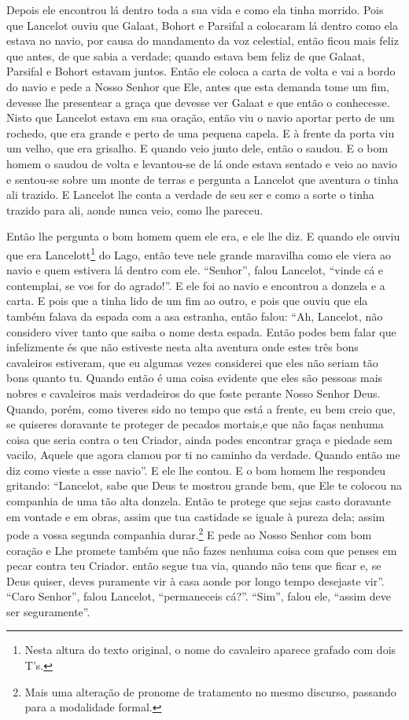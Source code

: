 Depois ele encontrou lá dentro toda a sua vida e como ela tinha morrido. Pois
que Lancelot ouviu que Galaat, Bohort e Parsifal a colocaram lá dentro como
ela estava no navio, por causa do mandamento da voz celestial, então ficou mais
feliz que antes, de que sabia a verdade; quando estava bem feliz de que Galaat,
Parsifal e Bohort estavam juntos. Então ele coloca a carta de volta e vai a
bordo do navio e pede a Nosso Senhor que Ele, antes que esta demanda tome um
fim, devesse lhe presentear a graça que devesse ver Galaat e que então o
conhecesse. Nisto que Lancelot estava em sua oração, então viu o navio aportar
perto de um rochedo, que era grande e perto de uma pequena capela. E à frente
da porta viu um velho, que era grisalho. E quando veio junto dele, então o
saudou. E o bom homem o saudou de volta e levantou-se de lá onde estava sentado
e veio ao navio e sentou-se sobre um monte de terras e pergunta a Lancelot que
aventura o tinha ali trazido. E Lancelot lhe conta a verdade de seu ser e como
a sorte o tinha trazido para ali, aonde nunca veio, como lhe pareceu.

Então lhe pergunta o bom homem quem ele era, e ele lhe diz. E quando ele ouviu
que era Lancelott\footnote{ Nesta altura do texto original, o nome do
cavaleiro aparece grafado com dois T’s.}  do Lago, então teve nele
grande maravilha como ele viera ao navio e quem estivera lá dentro com ele.
“Senhor”, falou Lancelot, “vinde cá e contemplai, se vos for do agrado!”. E
ele foi ao navio e encontrou a donzela e a carta. E pois que a tinha lido de um
fim ao outro, e pois que ouviu que ela também falava da espada com a asa
estranha, então falou: “Ah, Lancelot, não considero viver tanto que saiba o
nome desta espada. Então podes bem falar que infelizmente és que não estiveste
nesta alta aventura onde estes três bons cavaleiros estiveram, que eu algumas
vezes considerei que eles não seriam tão bons quanto tu. Quando então é uma
coisa evidente que eles são pessoas mais nobres e cavaleiros mais verdadeiros
do que foste perante Nosso Senhor Deus. Quando, porém, como tiveres sido no
tempo que está a frente, eu bem creio que, se quiseres doravante te proteger de
pecados mortais,e que não faças nenhuma coisa que seria contra o teu Criador,
ainda podes encontrar graça e piedade sem vacilo, Aquele que agora clamou por
ti no caminho da verdade. Quando então me diz como vieste a esse
navio”. E ele lhe contou. E o bom homem lhe respondeu gritando: “Lancelot,
sabe que Deus te mostrou grande bem, que Ele te colocou na companhia de uma tão
alta donzela. Então te protege que sejas casto doravante em vontade e em obras,
assim que tua castidade se iguale à pureza dela; assim pode a vossa segunda
companhia durar.\footnote{ Mais uma alteração de pronome de tratamento no mesmo
discurso, passando para a modalidade formal.}  E pede ao Nosso
Senhor com bom coração e Lhe promete também que não fazes nenhuma coisa com que
penses em pecar contra teu Criador. então segue tua via, quando não tens que
ficar e, se Deus quiser, deves puramente vir à casa aonde por longo tempo
desejaste vir”. “Caro Senhor”, falou Lancelot, “permaneceis cá?”. “Sim”, falou
ele, “assim deve ser seguramente”.

